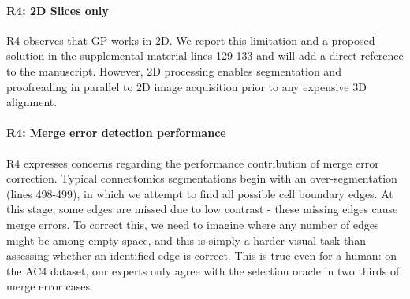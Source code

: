 \documentclass[10pt,twocolumn,letterpaper]{article}
\begin{document}
\paragraph{R4: 2D Slices only} R4 observes that GP works in 2D. We report this limitation and a proposed solution in the supplemental material lines 129-133 and will add a direct reference to the manuscript. However, 2D processing enables segmentation and proofreading in parallel to 2D image acquisition prior to any expensive 3D alignment.

\paragraph{R4: Merge error detection performance} R4 expresses concerns regarding the performance contribution of merge error correction. Typical connectomics segmentations begin with an over-segmentation (lines 498-499), in which we attempt to find all possible cell boundary edges. At this stage, some edges are missed due to low contrast - these missing edges cause merge errors. To correct this, we need to imagine where any number of edges might be among empty space, and this is simply a harder visual task than assessing whether an identified edge is correct. This is true even for a human: on the AC4 dataset, our experts only agree with the selection oracle in two thirds of merge error cases.


{\small


}
\end{document}
